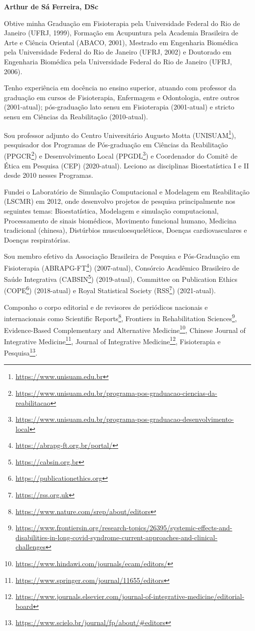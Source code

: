 \documentclass[
  a4paper,
]{book}
\renewcommand{\href}[2]{#2\footnote{\url{#1}}}
\begin{document}
\textbf{Arthur de Sá Ferreira, DSc}

Obtive minha Graduação em Fisioterapia pela Universidade Federal do Rio de Janeiro (UFRJ, 1999), Formação em Acupuntura pela Academia Brasileira de Arte e Ciência Oriental (ABACO, 2001), Mestrado em Engenharia Biomédica pela Universidade Federal do Rio de Janeiro (UFRJ, 2002) e Doutorado em Engenharia Biomédica pela Universidade Federal do Rio de Janeiro (UFRJ, 2006).

Tenho experiência em docência no ensino superior, atuando com professor da graduação em cursos de Fisioterapia, Enfermagem e Odontologia, entre outros (2001-atual); pós-graduação lato sensu em Fisioterapia (2001-atual) e stricto sensu em Ciências da Reabilitação (2010-atual).

Sou professor adjunto do Centro Universitário Augusto Motta (\href{https://www.unisuam.edu.br}{UNISUAM}), pesquisador dos Programas de Pós-graduação em Ciências da Reabilitação (\href{https://www.unisuam.edu.br/programa-pos-graduacao-ciencias-da-reabilitacao}{PPGCR}) e Desenvolvimento Local (\href{https://www.unisuam.edu.br/programa-pos-graduacao-desenvolvimento-local}{PPGDL}) e Coordenador do Comitê de Ética em Pesquisa (CEP) (2020-atual). Leciono as disciplinas Bioestatística I e II desde 2010 nesses Programas.

Fundei o Laboratório de Simulação Computacional e Modelagem em Reabilitação (LSCMR) em 2012, onde desenvolvo projetos de pesquisa principalmente nos seguintes temas: Bioestatística, Modelagem e simulação computacional, Processamento de sinais biomédicos, Movimento funcional humano, Medicina tradicional (chinesa), Distúrbios musculoesqueléticos, Doenças cardiovasculares e Doenças respiratórias.

Sou membro efetivo da Associação Brasileira de Pesquisa e Pós-Graduação em Fisioterapia (\href{https://abrapg-ft.org.br/portal/}{ABRAPG-FT}) (2007-atual), Consórcio Acadêmico Brasileiro de Saúde Integrativa (\href{https://cabsin.org.br}{CABSIN}) (2019-atual), Committee on Publication Ethics (\href{https://publicationethics.org}{COPE}) (2018-atual) e Royal Statistical Society (\href{https://rss.org.uk}{RSS}) (2021-atual).

Componho o corpo editorial e de revisores de periódicos nacionais e internacionais como \href{https://www.nature.com/srep/about/editors}{Scientific Reports}, \href{https://www.frontiersin.org/research-topics/26395/systemic-effects-and-disabilities-in-long-covid-syndrome-current-approaches-and-clinical-challenges}{Frontiers in Rehabilitation Sciences}, \href{https://www.hindawi.com/journals/ecam/editors/}{Evidence-Based Complementary and Alternative Medicine}, \href{https://www.springer.com/journal/11655/editors}{Chinese Journal of Integrative Medicine}, \href{https://www.journals.elsevier.com/journal-of-integrative-medicine/editorial-board}{Journal of Integrative Medicine}, \href{https://www.scielo.br/journal/fp/about/\#editors}{Fisioterapia e Pesquisa}.
\end{document}
